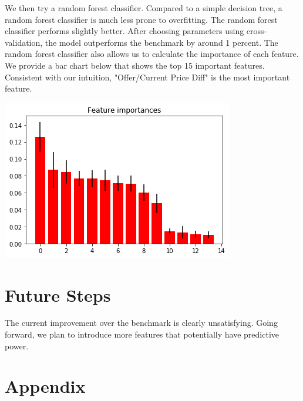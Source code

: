 \documentclass[a4paper]{article}
\begin{document}
We then try a random forest classifier. Compared to a simple decision tree, a random forest classifier is much less prone to overfitting. The random forest classifier performs slightly better. After choosing parameters using cross-validation, the model outperforms the benchmark by around 1 percent.  The random forest classifier also allows us to calculate the importance of each feature. We provide a bar chart below that shows the top 15 important features. Consistent with our intuition, "Offer/Current Price Diff" is the most important feature. 

\begin{center}
\includegraphics[scale=0.5]{Feature_Importance.png} 

\end{center}


\section{Future Steps }
\label{sec:future}

The current improvement over the benchmark is clearly unsatisfying. Going forward, we plan to introduce more features that potentially have predictive power. 


\section{Appendix }
\label{sec:tables}
\end{document}
